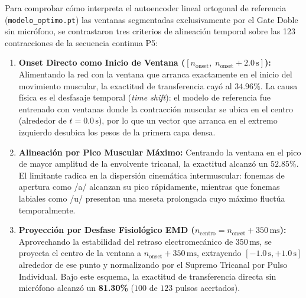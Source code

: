 \documentclass[11pt,a4paper]{article}
\begin{document}
Para comprobar cómo interpreta el autoencoder lineal ortogonal de referencia (\texttt{modelo\_optimo.pt}) las ventanas segmentadas exclusivamente por el Gate Doble sin micrófono, se contrastaron tres criterios de alineación temporal sobre las 123 contracciones de la secuencia continua P5:
\begin{enumerate}
    \item \textbf{Onset Directo como Inicio de Ventana ($[n_{\text{onset}}, \; n_{\text{onset}} + 2.0\,\text{s}]$):}
    Alimentando la red con la ventana que arranca exactamente en el inicio del movimiento muscular, la exactitud de transferencia cayó al $34.96\%$. La causa física es el desfasaje temporal (\textit{time shift}): el modelo de referencia fue entrenado con ventanas donde la contracción muscular se ubica en el centro (alrededor de $t = 0.0\,\text{s}$), por lo que un vector que arranca en el extremo izquierdo desubica los pesos de la primera capa densa.
    \item \textbf{Alineación por Pico Muscular Máximo:}
    Centrando la ventana en el pico de mayor amplitud de la envolvente tricanal, la exactitud alcanzó un $52.85\%$. El limitante radica en la dispersión cinemática intermuscular: fonemas de apertura como /a/ alcanzan su pico rápidamente, mientras que fonemas labiales como /u/ presentan una meseta prolongada cuyo máximo fluctúa temporalmente.
    \item \textbf{Proyección por Desfase Fisiológico EMD ($n_{\text{centro}} = n_{\text{onset}} + 350\,\text{ms}$):}
    Aprovechando la estabilidad del retraso electromecánico de $350\,\text{ms}$, se proyecta el centro de la ventana a $n_{\text{onset}} + 350\,\text{ms}$, extrayendo $[-1.0\,\text{s}, +1.0\,\text{s}]$ alrededor de ese punto y normalizando por el Supremo Tricanal por Pulso Individual. Bajo este esquema, la exactitud de transferencia directa sin micrófono alcanzó un \textbf{81.30\%} ($100$ de $123$ pulsos acertados).
\end{enumerate}
\end{document}
